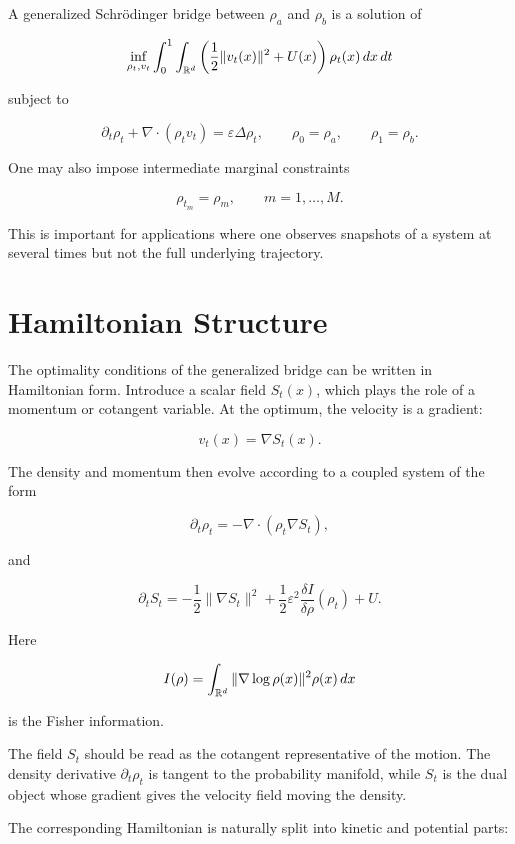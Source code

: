 \begin{definition}
A generalized Schr\"odinger bridge between $\rho_a$ and $\rho_b$ is a solution
of

\[
\inf_{\rho_t,v_t}
\int_0^1
\int_{\mathbb{R}^d}
\left(
\frac12\|v_t(x)\|^2+U(x)
\right)
\rho_t(x)\,dx\,dt
\]

subject to

\[
\partial_t\rho_t+\nabla\cdot(\rho_t v_t)
=
\varepsilon\Delta\rho_t,
\qquad
\rho_0=\rho_a,
\qquad
\rho_1=\rho_b.
\]
\end{definition}

One may also impose intermediate marginal constraints

\[
\rho_{t_m}=\rho_m,
\qquad
m=1,\dots,M.
\]

This is important for applications where one observes snapshots of a system at
several times but not the full underlying trajectory.

\section{Hamiltonian Structure}

The optimality conditions of the generalized bridge can be written in
Hamiltonian form. Introduce a scalar field $S_t(x)$, which plays the role of a
momentum or cotangent variable. At the optimum, the velocity is a gradient:

\[
v_t(x)=\nabla S_t(x).
\]

The density and momentum then evolve according to a coupled system of the form

\[
\partial_t\rho_t
=
-\nabla\cdot(\rho_t\nabla S_t),
\]

and

\[
\partial_t S_t
=
-\frac12\|\nabla S_t\|^2
+\frac12\varepsilon^2
\frac{\delta I}{\delta\rho}(\rho_t)
+U.
\]

Here

\[
I(\rho)
=
\int_{\mathbb{R}^d}
\|\nabla\log\rho(x)\|^2
\rho(x)\,dx
\]

is the Fisher information.

\begin{remark}
The field $S_t$ should be read as the cotangent representative of the motion.
The density derivative $\partial_t\rho_t$ is tangent to the probability
manifold, while $S_t$ is the dual object whose gradient gives the velocity
field moving the density.
\end{remark}

The corresponding Hamiltonian is naturally split into kinetic and potential
parts:

